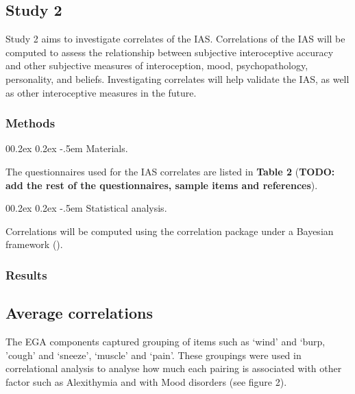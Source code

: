 \documentclass[
  man,
  floatsintext,
  longtable,
  nolmodern,
  notxfonts,
  notimes,
  colorlinks=true,linkcolor=blue,citecolor=blue,urlcolor=blue]{apa7}
\makeatletter
\renewcommand{\paragraph}{\@startsection{paragraph}{4}{\parindent}%
	{0\baselineskip \@plus 0.2ex \@minus 0.2ex}%
	{-.5em}%
	{\normalfont\normalsize\bfseries\typesectitle}}
\makeatother
\begin{document}
\subsection{Study 2}\label{study-2}

Study 2 aims to investigate correlates of the IAS. Correlations of the
IAS will be computed to assess the relationship between subjective
interoceptive accuracy and other subjective measures of interoception,
mood, psychopathology, personality, and beliefs. Investigating
correlates will help validate the IAS, as well as other interoceptive
measures in the future.

\subsubsection{Methods}\label{methods-1}

\paragraph{Materials.}\label{materials}

The questionnaires used for the IAS correlates are listed in
\textbf{Table 2} (\textbf{TODO: add the rest of the questionnaires,
sample items and references}).



\paragraph{Statistical analysis.}\label{statistical-analysis-1}

Correlations will be computed using the correlation package under a
Bayesian framework ().

\subsubsection{Results}\label{results-1}

\subsection{Average correlations}\label{average-correlations}

The EGA components captured grouping of items such as `wind' and `burp,
'cough' and `sneeze', `muscle' and `pain'. These groupings were used in
correlational analysis to analyse how much each pairing is associated
with other factor such as Alexithymia and with Mood disorders (see
figure 2).
\end{document}

